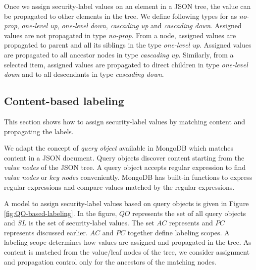   


 Once we assign security-label values on an element in a JSON tree, the value can be propagated to other elements in the tree. We define following  types for \propagationControl{} as \textit{no-prop},  \textit{one-level up}, \textit{one-level down},  \textit{cascading up} and \textit{cascading down}. Assigned values are not propagated in type \textit{no-prop}. From a node, assigned values are propagated to parent and all its siblings in the type \textit{one-level up}. Assigned values are propagated to all ancestor nodes in type \textit{cascading up}. Similarly, from a selected item, assigned values are propagated to direct children in type \textit{one-level down} and to all descendants in type \textit{cascading down}. %
 
% 
 

\subsection{Content-based labeling}

  


This section shows how to assign security-label values by matching content and propagating the labels.

We adapt the concept of \textit{query object} available in MongoDB \cite{mongodb} which matches content in a JSON document. Query objects discover content starting from the \textit{value nodes} of the JSON tree. A query object accepts regular expression to find \textit{value nodes}  or \textit{key nodes} conveniently. MongoDB has built-in functions to express regular expressions and compare values matched by the regular expressions. 

A model to assign {security-label} values based on query objects is given in Figure \ref{fig:QO-based-labeling}. In the figure, $QO$ represents the set of all query objects and $SL$ is the set of {security-label} values. The set $AC$ represents \assignmentControl{} and $PC$ represents \propagationControl{} discussed earlier.  $AC$ and $PC$ together define labeling scopes. A labeling scope determines how values are assigned and propagated in the tree. As content is matched from the value/leaf nodes of the tree, we consider assignment and propagation control only for the ancestors of the matching nodes.

